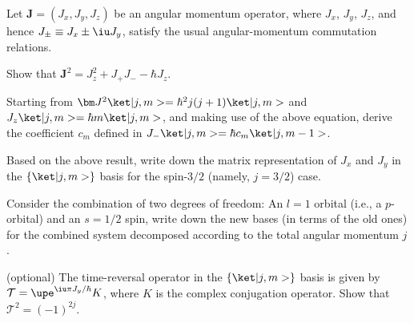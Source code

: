 \begin{problem}
  Let $\bm J = (J_x, J_y, J_z)$ be an angular momentum operator, where $J_x$,
  $J_y$, $J_z$, and hence $J_\pm \equiv J_x \pm \iu J_y$, satisfy the usual
  angular-momentum commutation relations.
  \begin{enumext*}[label = (\alph*)]
    \item Show that $\bm J^2 = J_z^2 + J_+J_- - \hbar J_z$.
    \item Starting from $\bm J^2\ket|j, m> = \hbar^2 j(j + 1) \ket|j, m>$
    and $J_z\ket|j, m> = \hbar m \ket|j, m>$, and making use of the above
    equation, derive the coefficient $c_m$ defined
    in $J_-\ket|j, m> = \hbar c_m\ket|j, m - 1>$.
    \item Based on the above result, write down the matrix representation of
    $J_x$ and $J_y$ in the $\{\ket|j, m>\}$ basis for the spin-$3/2$
    (namely, $j = 3/2$) case.
    \item Consider the combination of two degrees of freedom: An $l = 1$ orbital
    (i.e., a $p$-orbital) and an $s = 1/2$ spin, write down the new bases
    (in terms of the old ones) for the combined system decomposed according to
    the total angular momentum $j$.
    \item* (optional) The time-reversal operator in the $\{\ket|j, m>\}$ basis
    is given by $\mathcal T = \upe^{\iu\pi J_y/\hbar} K$, where $K$ is the
    complex conjugation operator. Show that $\mathcal T^2 = (-1)^{2j}$.
  \end{enumext*}
\end{problem}
